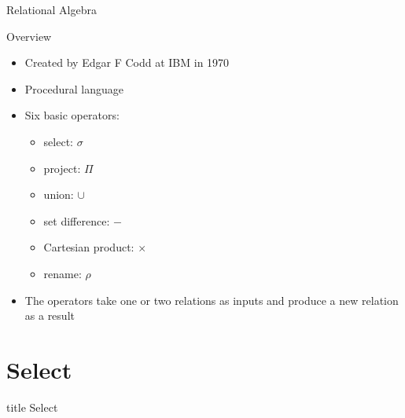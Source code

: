 \documentclass[aspectratio=169, xcolor=dvipsnames]{beamer}
\begin{document}
\begin{frame}{Relational Algebra}
    \begin{block}{Overview}
        \begin{itemize}[<+->]
            \item Created by Edgar F Codd at IBM in 1970
            \item Procedural language
            \item Six basic operators:
            \begin{itemize}
                \item[$\triangleright$] select: $\sigma$
                \item[$\triangleright$] project: $\Pi$
                \item[$\triangleright$] union: $\cup$
                \item[$\triangleright$] set difference: $-$
                \item[$\triangleright$] Cartesian product: $\times$
                \item[$\triangleright$] rename: $\rho$
            \end{itemize}
            \item The operators take one or two relations as inputs and produce a new relation as a result
        \end{itemize}
    \end{block}
\end{frame}

\section{Select}
\begin{frame}
  \vfill
  \centering
  \begin{beamercolorbox}[sep=8pt,center,shadow=true,rounded=true]{title}
    Select\par%
  \end{beamercolorbox}
  \vfill
\end{frame}
\end{document}

